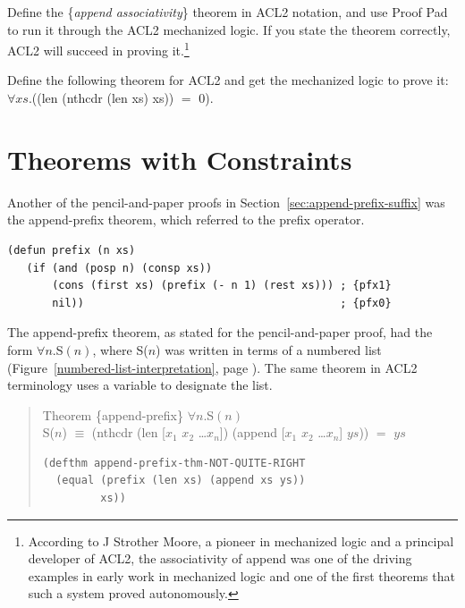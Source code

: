 \begin{ExerciseList}

\Exercise Define the
\{\emph{append associativity}\}
theorem in ACL2 notation,
and use Proof Pad to run it through the ACL2 mechanized logic.
If you state the theorem correctly, ACL2 will succeed in proving it.\footnote{According
to J Strother Moore, a pioneer
in mechanized logic and a principal developer of ACL2,
the associativity of append was one of the driving examples in early work in
mechanized logic and one of the first theorems that such a system proved autonomously.}

\Exercise Define the following theorem for ACL2 and get the mechanized logic to prove it:
$\forall xs.$((len (nthcdr (len xs) xs)) $=$ 0).

\end{ExerciseList}

\section{Theorems with Constraints}
\label{sec:implies-constraints}

Another of the pencil-and-paper proofs in Section~\ref{sec:append-prefix-suffix}
was the append-prefix theorem,
which referred to the prefix operator.

\begin{Verbatim}
(defun prefix (n xs)
   (if (and (posp n) (consp xs))
       (cons (first xs) (prefix (- n 1) (rest xs))) ; {pfx1}
       nil))                                        ; {pfx0}
\end{Verbatim}

The append-prefix theorem, as stated for the pencil-and-paper proof,
had the form $\forall n.$S$(n)$,
where S($n$)
was written in terms of a numbered list
(Figure~\ref{numbered-list-interpretation}, page \pageref{numbered-list-interpretation}).
The same theorem in ACL2 terminology uses a variable to designate the list.
\begin{samepage}
\begin{quote}
Theorem \{append-prefix\} $\forall n.$S$(n)$ \\
S($n$) $\equiv$ (nthcdr (len [$x_1$ $x_2$ \dots $x_n$]) (append [$x_1$ $x_2$ \dots $x_n$] $ys$)) $=$ $ys$
\begin{Verbatim}
(defthm append-prefix-thm-NOT-QUITE-RIGHT
  (equal (prefix (len xs) (append xs ys))
         xs))
\end{Verbatim}
\end{quote}
\end{samepage}

